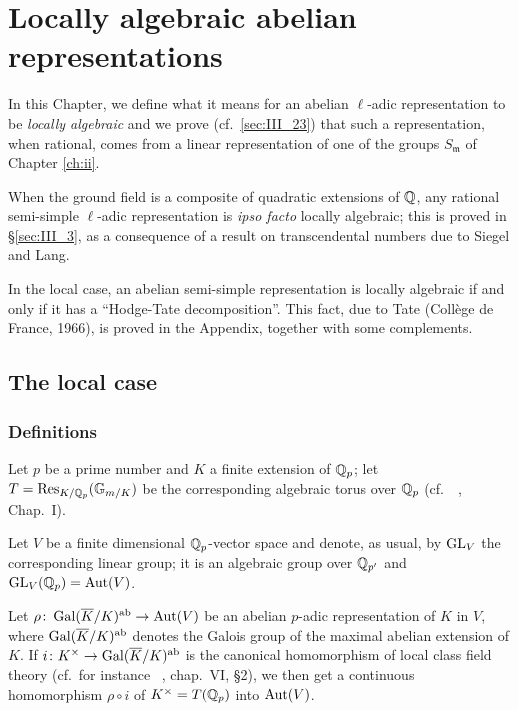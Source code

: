 \chapter{Locally algebraic abelian representations}
\label{ch:iii}

\dpage
In this Chapter, we define what it means for an abelian $\ell$-adic
representation to be \emph{locally algebraic} and we prove (cf.\
\ref{sec:III_23}) that such a representation, when rational, comes from a
linear representation of one of the groups $S_{\mathfrak{m}}$ of Chapter
\ref{ch:ii}.

When the ground field is a composite of quadratic extensions of $\mathbb{Q}$, any
rational semi-simple $\ell$-adic representation is \emph{ipso facto} locally
algebraic; this is proved in \S\ref{sec:III_3}, as a consequence of a result on
transcendental numbers due to Siegel and Lang.

In the local case, an abelian semi-simple representation is
locally algebraic if and only if it has a ``Hodge-Tate decomposition''.
This fact, due to Tate (Collège de France, 1966), is proved in the
Appendix, together with some complements.

\section{The local case}
\label{sec:III_1}

\subsection{Definitions}
\label{sec:III_11}
Let $p$ be a prime number and $K$ a finite extension of $\mathbb{Q}_p$; let $T =
\operatorname{Res}_{K/\mathbb{Q}_p}(\mathbb{G}_{m/K})$ be the corresponding algebraic torus over
\dpage
$\mathbb{Q}_p$ (cf.\ \citeauthor{43}~\cite{43}, Chap.~I).

Let $V$ be a finite dimensional $\mathbb{Q}_p$-vector space and denote, as usual, by
$\operatorname{GL}_V$ the corresponding linear group; it is an algebraic group over $\mathbb{Q}_{p'}$
and $\operatorname{GL}_V(\mathbb{Q}_p) = \operatorname{Aut}(V)$.

Let $\rho \colon \operatorname{Gal}(\overline{K}/K)^{\mathrm{ab}} \to \operatorname{Aut}(V)$ be an abelian $p$-adic
representation of $K$ in $V$, where $\operatorname{Gal}(\overline{K}/K)^{\mathrm{ab}}$ denotes the Galois
group of the maximal abelian extension of $K$.
If $i \colon K^\times \to \operatorname{Gal}(\overline{K}/K)^{\mathrm{ab}}$ is the canonical homomorphism
of local class field theory (cf.\ for instance \citeauthor{6}~\cite{6},
chap.~VI, \S2), we then get a continuous homomorphism $\rho \circ i$ of
$K^\times = T(\mathbb{Q}_p)$ into $\operatorname{Aut}(V)$.

